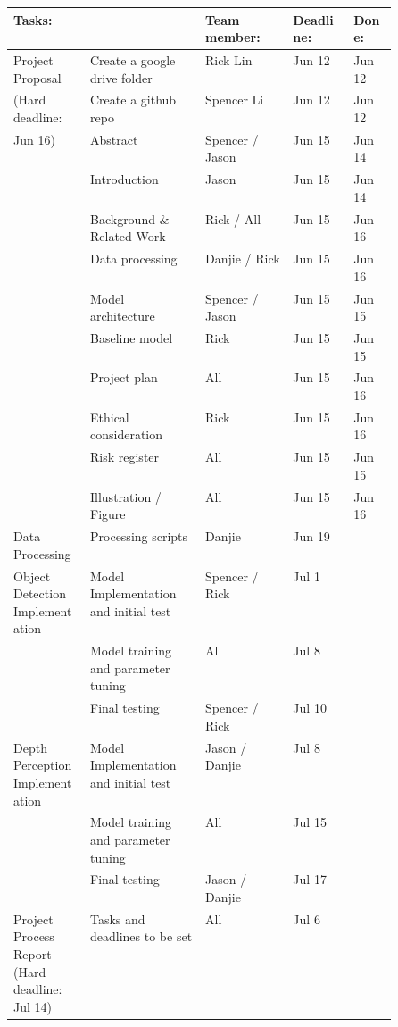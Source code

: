 \documentclass{article} %
\begin{document}
\begin{longtable}{|p{0.2\linewidth}|p{0.3\linewidth}|l|l|l|} \hline
    \centering
        Tasks: & ~ & Team member: & Deadline: & Done: \\ \hline
        Project Proposal & Create a google drive folder & Rick Lin & Jun 12 & Jun 12 \\ 
        (Hard deadline: & Create a github repo & Spencer Li & Jun 12 & Jun 12 \\ 
        Jun 16) & Abstract & Spencer / Jason & Jun 15 & Jun 14 \\ 
        ~ & Introduction & Jason & Jun 15 & Jun 14 \\ 
        ~ & Background \& Related Work & Rick / All & Jun 15 & Jun 16 \\ 
        ~ & Data processing & Danjie / Rick & Jun 15 & Jun 16 \\ 
        ~ & Model architecture & Spencer / Jason & Jun 15 & Jun 15 \\ 
        ~ & Baseline model & Rick & Jun 15  & Jun 15 \\ 
        ~ & Project plan & All & Jun 15  & Jun 16 \\ 
        ~ & Ethical consideration & Rick & Jun 15 & Jun 16 \\ 
        ~ & Risk register & All & Jun 15  & Jun 15 \\ 
        ~ & Illustration / Figure & All & Jun 15  & Jun 16 \\ \hline
        Data Processing & Processing scripts & Danjie & Jun 19 & ~ \\ \hline
        Object Detection Implementation& Model Implementation and initial test & Spencer / Rick & Jul 1 & ~ \\ 
        ~ & Model training and parameter tuning & All & Jul 8 & ~ \\ 
        ~ & Final testing & Spencer / Rick & Jul 10 & ~ \\ \hline
        Depth Perception Implementation& Model Implementation and initial test & Jason / Danjie & Jul 8 & ~ \\ 
        ~ & Model training and parameter tuning & All & Jul 15 & ~ \\ 
        ~ & Final testing & Jason / Danjie & Jul 17 & ~ \\ \hline
        Project Process Report (Hard deadline: Jul 14)& Tasks and deadlines to be set & All & Jul 6 & ~ \\ \hline

\end{longtable}
\end{document}
